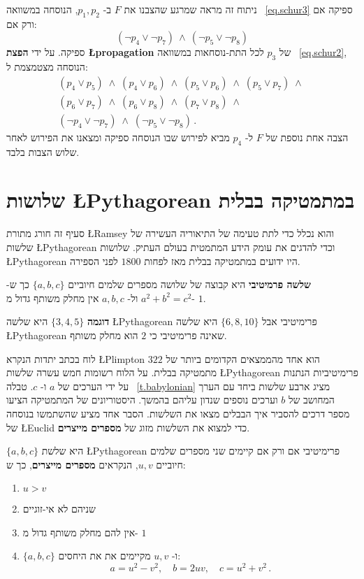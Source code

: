 ניתוח זה מראה שמרגע שהצבנו את
$F$
ב-%
$p_1,p_2$,
הנוסחה במשוואה
~\ref{eq.schur3}
ספיקה אם ורק אם:
\[
(\neg p_4 \vee \neg p_7) \:\wedge\: (\neg p_5 \vee \neg p_8)
\]
ספיקה. על ידי
\textbf{הפצת \L{propagation}}
של
$p_3$
לכל התת-נוסחאות במשוואה%
~\ref{eq.schur2}, 
הנוסחה מצטמצמת ל:
\[
\begin{array}{l}
(p_4\vee p_5)\;\wedge\;(p_4\vee p_6)\;\wedge\;(p_5\vee p_6)\;\wedge\;(p_5\vee p_7)\;\wedge\;\\
(p_6\vee p_7)\;\wedge\;(p_6\vee p_8)\;\wedge\;(p_7\vee p_8)\;\wedge\\
(\neg p_4\vee \neg p_7)\;\wedge\;
(\neg p_5\vee \neg p_8)\,.
\end{array}
\]
הצבה אחת נוספת של
$F$
ל-%
$p_4$
מביא לפירוש שבו הנוסחה ספיקה ומצאנו את הפירוש לאחר שלוש הצבות בלבד.


\section{שלושות \L{Pythagorean} במתמטיקה בבלית}\label{s.plimpton}

סעיף זה חורג מתורת
\L{Ramsey}
והוא נכלל כדי לתת טעימה של התיאוריה העשירה של שלשות
\L{Pythagorean}
וכדי להדגים את עומק הידע המתמטית בעולם העתיק. שלושות
\L{Pythagorean}
היו ידועים במתמטיקה בבלית
מאז לפחות 
$1800$
לפני הספירה.
\begin{definition}
\textbf{שלשה פרמיטיבי}
היא קבוצה של שלושה מספרים שלמים חיוביים
$\{a,b,c\}$ 
כך ש-%
$a^2+b^2=c^2$
ול-%
$a,b,c$
אין מחלק משותף גדול מ-%
$1$.
\end{definition}
\textbf{דוגמה}
$\{3,4,5\}$
היא שלשה
\L{Pythagorean}
פרימיטיבי אבל 
$\{6,8,10\}$
היא שלשה
\L{Pythagorean}
שאינה פרימיטיבי כי
$2$
הוא מחלק משותף.

לוח בכתב יתדות הנקרא 
\L{Plimpton $322$}
הוא אחד מהממצאים הקדומים ביותר של מתמטיקה בבלית. על הלוח רשומות חמש עשרה שלשות 
\L{Pythagorean}
פרימיטיביות הנתנות על ידי הערכים של
$a$
ו-%
$c$.
טבלה%
~\ref{t.babylonian}
מציג ארבע שלשות ביחד עם הערך המחושב של 
$b$
וערכים נוספים שנדון עליהם בהמשך. היסטוריונים של המתמטיקה הציעו מספר דרכים להסביר איך הבבלים מצאו את השלשות. הסבר אחד מציע שהשתמשו בנוסחה של
\L{Euclid}
כדי למצוא את השלשות מזוג של
\textbf{מספרים מייצרים}.
\begin{theorem}[\L{Euclid}]
$\{a,b,c\}$ 
היא שלשת 
\L{Pythagorean}
פרימיטיבי אם ורק אם קיימים שני מספרים שלמים חיוביים 
$u,v$,
הנקראים
\textbf{מספרים מייצרים},
כך ש:
\label{thm.euclid-function}
\begin{enumerate}
\item $u>v$
\item
שניהם לא אי-זוגיים
\item
אין להם מחלק משותף גדול מ-%
$1$
\item 
$\{a,b,c\}$
ו-%
$u,v$
מקיימים את את היחסים:
\[
a=u^2-v^2,\quad b=2uv,\quad c=u^2+v^2\,.
\]
\end{enumerate}
\end{theorem}

